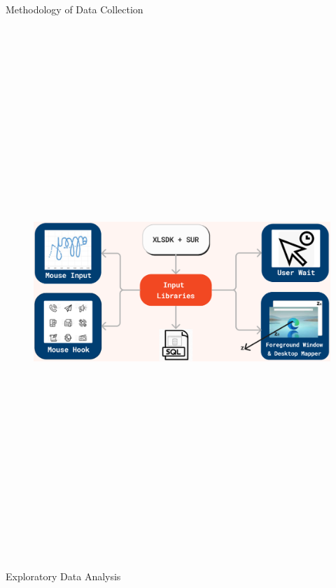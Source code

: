 \documentclass[final]{beamer}
\newlength{\colwidth}
\begin{document}
\begin{frame}[t]
\begin{columns}[t]
\begin{column}{\colwidth}
\begin{alertblock}{\huge{Methodology of Data Collection}}
          \begin{figure}
          \includegraphics[width=0.96 \textwidth, height=20cm]{data-collection4.jpeg}
          
          \end{figure}
      \end{alertblock}

      \begin{block}{\huge{Exploratory Data Analysis}}



\end{block}
\end{column}
\end{columns}
\end{frame}
\end{document}
